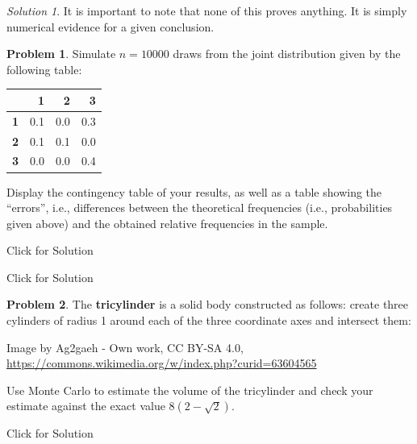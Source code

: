 \documentclass[
]{book}
\theoremstyle{definition}
\theoremstyle{definition}
\theoremstyle{definition}
\newtheorem{exercise}{Problem}[chapter]
\theoremstyle{definition}
\theoremstyle{remark}
\newtheorem*{solution}{Solution}
\begin{document}
\begin{solution}
It is important to note that none of this proves anything. It is simply
numerical evidence for a given conclusion.
\end{solution}

\begin{exercise}
Simulate \(n=10000\) draws from the joint distribution given by the following
table:

\begin{table}
\centering
\begin{tabular}{>{}l|r|r|r}
\hline
  & 1 & 2 & 3\\
\hline
\textbf{1} & 0.1 & 0.0 & 0.3\\
\hline
\textbf{2} & 0.1 & 0.1 & 0.0\\
\hline
\textbf{3} & 0.0 & 0.0 & 0.4\\
\hline
\end{tabular}
\end{table}

Display the contingency table of your results, as well as a table
showing the
``errors'', i.e., differences between the theoretical frequencies
(i.e., probabilities given above) and the obtained relative
frequencies in the sample.
\end{exercise}

Click for Solution

Click for Solution

\begin{exercise}
The \textbf{tricylinder} is a solid body constructed as follows: create three
cylinders of radius 1 around each of the three coordinate axes and intersect
them:

Image by Ag2gaeh - Own work, CC BY-SA 4.0, \url{https://commons.wikimedia.org/w/index.php?curid=63604565}

Use Monte Carlo to estimate the volume of the tricylinder and
check your estimate against the exact value \(8(2-\sqrt{2})\).
\end{exercise}

Click for Solution
\end{document}
